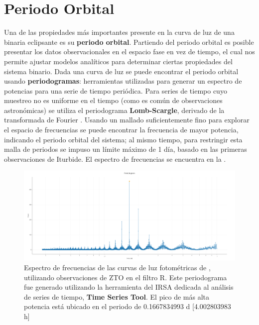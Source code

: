 \chapter{Periodo Orbital} \label{metodologia:analisisperiodo}

Una de las propiedades más importantes presente en la curva de luz de una
binaria eclipsante es su \textbf{periodo orbital}. Partiendo del periodo orbital
es posible presentar los datos observacionales en el espacio fase en vez de
tiempo, el cual nos permite ajustar modelos analíticos para determinar ciertas
propiedades del sistema binario. Dada una curva de luz se puede encontrar el
periodo orbital usando \textbf{periodogramas}: herramientas utilizadas para
generar un espectro de potencias para una serie de tiempo periódica. Para series
de tiempo cuyo muestreo no es uniforme en el tiempo (como es común de
observaciones astronómicas) se utiliza el periodograma \textbf{Lomb-Scargle},
derivado de la transformada de Fourier .
Usando un mallado suficientemente fino para explorar el espacio de frecuencias
se puede encontrar la frecuencia de mayor potencia, indicando el periodo orbital
del sistema; al mismo tiempo, para restringir esta malla de periodos se impuso
un límite máximo de 1 día, basado en las primeras observaciones de Iturbide. El
espectro de frecuencias se encuentra en la . 

\begin{figure}[!h]
	\centering
	\includegraphics[scale=0.23]{Metodologia/Secciones/AnalisisPeriodo/Figures/IRSA Periodogram.png}
	
	\caption{Espectro de frecuencias de las curvas de luz fotométricas de
	\atoObjIdNoSpace, utilizando observaciones de ZTO en el filtro R. Este
	periodograma fue generado utilizando la herramienta del IRSA dedicada al
	análisis de series de tiempo, \textbf{Time Series Tool}. El pico de más alta
	potencia está ubicado en el periodo de 0.1667834993 d [4.002803983 h]} 
	\label{periodogramaLSFrecs}
\end{figure}

